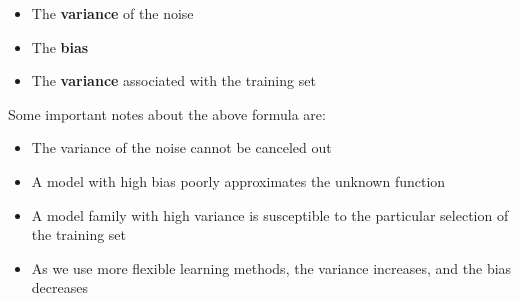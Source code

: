 \documentclass{article}
\begin{document}
\begin{itemize}
	\item The \textbf{variance} of the noise
	\item The \textbf{bias}
	\item The \textbf{variance} associated with the training set
\end{itemize}
Some important notes about the above formula are:

\begin{itemize}
	\item The variance of the noise cannot be canceled out
	\item A model with high bias poorly approximates the unknown function
	\item A model family with high variance is susceptible to the particular selection of the training set
	\item As we use more flexible learning methods, the variance increases, and the bias decreases
\end{itemize}
\end{document}
